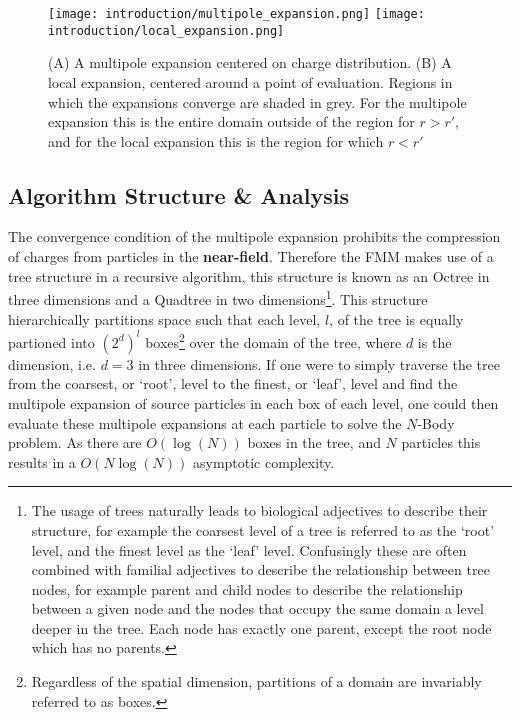 \begin{figure}[!h]
    \centering
    {\texttt{[image: introduction/multipole\_expansion.png]}}
    \hfill
  {\texttt{[image: introduction/local\_expansion.png]}}
  \vspace{0pt}
  \caption{(A) A multipole expansion centered on charge distribution. (B) A local
  expansion, centered around a point of evaluation. Regions in which the expansions
  converge are shaded in grey. For the multipole expansion this is the entire domain
  outside of the region for $r>r'$, and for the local expansion this is the region
  for which $r < r'$}

  \label{fig:1_1_multipole_local_expansions}
\end{figure}

\hspace{10pt}

\subsection{Algorithm Structure \& Analysis}

The convergence condition of the multipole expansion prohibits the compression
of charges from particles in the \textbf{\gls{near-field}}. Therefore the FMM
makes use of a tree structure in a recursive algorithm, this structure is known
as an Octree in three dimensions and a Quadtree in two dimensions\footnote{The usage
of trees naturally leads to biological adjectives to describe their structure, for example
the coarsest level of a tree is referred to as the `root' level, and the finest
level as the `leaf' level. Confusingly these are often combined with familial adjectives
to describe the relationship between tree nodes, for example parent and child nodes to describe
the relationship between a given node and the nodes that occupy the same domain
a level deeper in the tree. Each node has exactly one parent, except the root node which
has no parents.}. This structure
hierarchically partitions space such that each level, $l$, of the tree is equally partioned into
$(2^d)^l$ boxes\footnote{Regardless of the spatial dimension, partitions of a domain are invariably
referred to as boxes.} over the domain of the tree, where $d$ is the dimension,
i.e. $d=3$ in three dimensions. If one were to simply traverse the tree from
the coarsest, or `root', level to the finest, or `leaf', level and find the multipole expansion of source
particles in each box of each level, one could then evaluate these multipole expansions
at each particle to solve the $N$-Body problem. As there are $O(\log(N))$
boxes in the tree, and $N$ particles this results in a $O(N\log(N))$ asymptotic
complexity.

